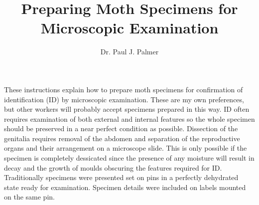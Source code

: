 \documentclass[10pt]{article}
\title{Preparing Moth Specimens for Microscopic Examination}
\author{Dr. Paul J. Palmer}
\begin{document}
{}
%


%	

These instructions explain how to prepare moth specimens for confirmation of  identification (ID) by microscopic examination. These are my own preferences, but other workers will probably accept specimens prepared in this way. ID often requires examination of both external and internal features so the whole specimen should be preserved in a near perfect condition as possible. Dissection of the genitalia requires removal of the abdomen and separation of the reproductive organs and their arrangement on a microscope slide. This is only possible if the specimen is completely dessicated since the presence of any moisture will result in decay and the growth of moulds obscuring the features required for ID. Traditionally specimens were presented set on pins in a perfectly dehydrated state ready for examination. Specimen details were included  on labels mounted on the same pin.
\end{document}
